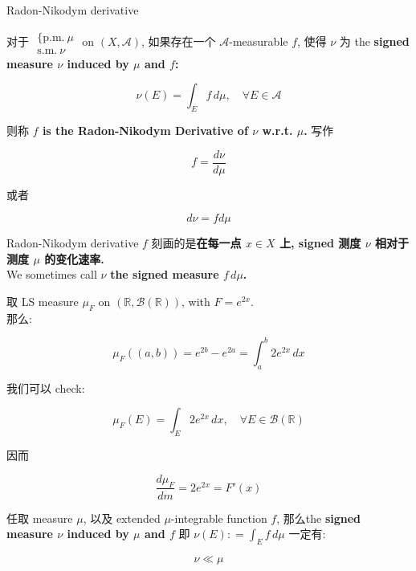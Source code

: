 \documentclass{qlnotes-export}
\begin{document}
\begin{definition}{Radon-Nikodym derivative}\label{def-11-radon-nikodym-theorem-radon-nikodym-derivative}

对于 \(\begin{matrix}
{\{\text{p.m.}\ \mu} \\
{\text{s.m.}\ \nu}
\end{matrix}\) on \((X,\mathcal{A})\), 如果存在一个 \(\mathcal{A}\)-measurable \(f\), 使得 \(\nu\) 为 the \textbf{signed measure \(\nu\) induced by \(\mu\) and \(f\):}

\[\nu(E) = \int_{E}f\, d\mu,\quad\forall E \in \mathcal{A}\]

则称 \textbf{\(f\) is the Radon-Nikodym Derivative of \(\nu\) w.r.t. \(\mu\).} 写作

\[f = \frac{d\nu}{d\mu}\]

或者

\[d\nu = fd\mu\]

\end{definition}

Radon-Nikodym derivative \(f\) 刻画的是\textbf{在每一点 \(x \in X\) 上, signed 测度 \(\nu\) 相对于测度 \(\mu\) 的变化速率.}\\
We sometimes call \(\nu\) \textbf{the signed measure \(f\, d\mu\).}\\

\begin{example}\label{ex-11-radon-nikodym-theorem-example-003}

取 LS measure \(\mu_{F}\) on \(({\mathbb{R}},\mathcal{B}({\mathbb{R}}))\), with \(F = e^{2x}\).\\
那么:

\[\mu_{F}((a,b)) = e^{2b} - e^{2a} = \int_{a}^{b}2e^{2x}\, dx\]

我们可以 check:

\[\mu_{F}(E) = \int_{E}2e^{2x}\, dx,\quad\forall E \in \mathcal{B}({\mathbb{R}})\]

因而

\[\frac{d\mu_{F}}{dm} = 2e^{2x} = F'(x)\]

\end{example}

\begin{proposition}\label{prop-11-radon-nikodym-theorem-proposition-002}

任取 measure \(\mu\), 以及 extended \(\mu\)-integrable function \(f\), 那么the \textbf{signed measure \(\nu\) induced by \(\mu\) and \(f\)} 即 \(\nu(E): = \int_{E}f\, d\mu\) 一定有:

\[\nu \ll \mu\]

\end{proposition}
\end{document}
